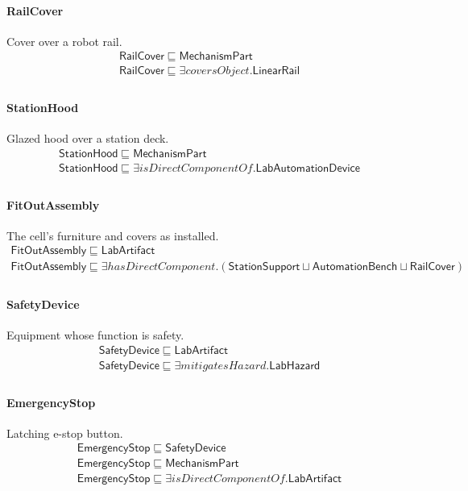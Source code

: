 \documentclass[10pt]{article}
\begin{document}
\paragraph{RailCover} Cover over a robot rail.
\[\begin{array}{l}
\mathsf{RailCover} \sqsubseteq  \mathsf{MechanismPart} \\
\mathsf{RailCover} \sqsubseteq  \exists \mathit{coversObject}.\mathsf{LinearRail} \\
\end{array}\]
\paragraph{StationHood} Glazed hood over a station deck.
\[\begin{array}{l}
\mathsf{StationHood} \sqsubseteq  \mathsf{MechanismPart} \\
\mathsf{StationHood} \sqsubseteq  \exists \mathit{isDirectComponentOf}.\mathsf{LabAutomationDevice} \\
\end{array}\]
\paragraph{FitOutAssembly} The cell's furniture and covers as installed.
\[\begin{array}{l}
\mathsf{FitOutAssembly} \sqsubseteq  \mathsf{LabArtifact} \\
\mathsf{FitOutAssembly} \sqsubseteq  \exists \mathit{hasDirectComponent}.(\mathsf{StationSupport} \sqcup  \mathsf{AutomationBench} \sqcup  \mathsf{RailCover}) \\
\end{array}\]
\paragraph{SafetyDevice} Equipment whose function is safety.
\[\begin{array}{l}
\mathsf{SafetyDevice} \sqsubseteq  \mathsf{LabArtifact} \\
\mathsf{SafetyDevice} \sqsubseteq  \exists \mathit{mitigatesHazard}.\mathsf{LabHazard} \\
\end{array}\]
\paragraph{EmergencyStop} Latching e-stop button.
\[\begin{array}{l}
\mathsf{EmergencyStop} \sqsubseteq  \mathsf{SafetyDevice} \\
\mathsf{EmergencyStop} \sqsubseteq  \mathsf{MechanismPart} \\
\mathsf{EmergencyStop} \sqsubseteq  \exists \mathit{isDirectComponentOf}.\mathsf{LabArtifact} \\
\end{array}\]
\end{document}
